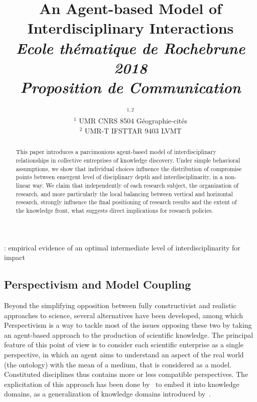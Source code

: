 


\title{An Agent-based Model of Interdisciplinary Interactions\\\medskip
\textit{Ecole thématique de Rochebrune 2018\\
Proposition de Communication
}
}
\author{$^{1,2}$\\
$^{1}$ UMR CNRS 8504 Géographie-cités\\
$^{2}$ UMR-T IFSTTAR 9403 LVMT
}
\date{}


\maketitle

\justify

\begin{abstract}
	This paper introduces a parcimonious agent-based model of interdisciplinary relationships in collective entreprises of knowledge discovery. Under simple behavioral assumptions, we show that individual choices influence the distribution of compromise points between emergent level of disciplinary depth and interdisciplinarity, in a non-linear way. We claim that independently of each research subject, the organization of research, and more particularly the local balancing between vertical and horizontal research, strongly influence the final positioning of research results and the extent of the knowledge front, what suggests direct implications for research policies.
\end{abstract}


\cite{lariviere2010relationship} : empirical evidence of an optimal intermediate level of interdisciplinarity for impact %



\subsection*{Perspectivism and Model Coupling}

Beyond the simplifying opposition between fully constructivist and realistic approaches to science, several alternatives have been developed, among which Perspectivism \cite{giere2010scientific} is a way to tackle most of the issues opposing these two by taking an agent-based approach to the production of scientific knowledge. The principal feature of this point of view is to consider each scientific enterprise as a single perspective, in which an agent aims to understand an aspect of the real world (the ontology) with the mean of a medium, that is considered as a model. Constituted disciplines thus contains more or less compatible perspectives. The explicitation of this approach has been done by~\cite{raimbault2017knowledge} to embed it into knowledge domains, as a generalization of knowledge domains introduced by~\cite{livet2010}.


